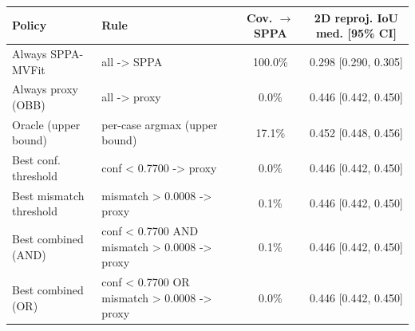 \begin{tabular}{@{}llcc@{}}
\toprule
Policy & Rule & Cov. $\to$ SPPA & 2D reproj. IoU med. [95\% CI] \\
\midrule
Always SPPA-MVFit & all -> SPPA & 100.0\% & 0.298 [0.290, 0.305] \\
Always proxy (OBB) & all -> proxy & 0.0\% & 0.446 [0.442, 0.450] \\
Oracle (upper bound) & per-case argmax (upper bound) & 17.1\% & 0.452 [0.448, 0.456] \\
\midrule
Best conf. threshold & conf < 0.7700 -> proxy & 0.0\% & 0.446 [0.442, 0.450] \\
Best mismatch threshold & mismatch > 0.0008 -> proxy & 0.1\% & 0.446 [0.442, 0.450] \\
Best combined (AND) & conf < 0.7700 AND mismatch > 0.0008 -> proxy & 0.1\% & 0.446 [0.442, 0.450] \\
Best combined (OR) & conf < 0.7700 OR mismatch > 0.0008 -> proxy & 0.0\% & 0.446 [0.442, 0.450] \\
\bottomrule
\end{tabular}
